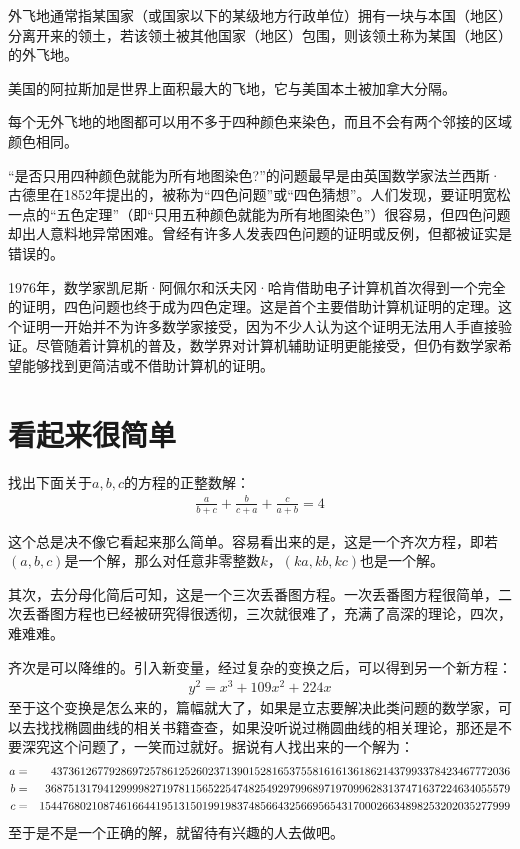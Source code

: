 \begin{definition}
  外飞地通常指某国家（或国家以下的某级地方行政单位）拥有一块与本国（地区）分离开来的领土，若该领土被其他国家（地区）包围，则该领土称为某国（地区）的外飞地。
\end{definition}

美国的阿拉斯加是世界上面积最大的飞地，它与美国本土被加拿大分隔。

\begin{example}
  每个无外飞地的地图都可以用不多于四种颜色来染色，而且不会有两个邻接的区域颜色相同。
\end{example}

“是否只用四种颜色就能为所有地图染色?”的问题最早是由英国数学家法兰西斯·古德里在1852年提出的，被称为“四色问题”或“四色猜想”。人们发现，要证明宽松一点的“五色定理”（即“只用五种颜色就能为所有地图染色”）很容易，但四色问题却出人意料地异常困难。曾经有许多人发表四色问题的证明或反例，但都被证实是错误的。

1976年，数学家凯尼斯·阿佩尔和沃夫冈·哈肯借助电子计算机首次得到一个完全的证明，四色问题也终于成为四色定理。这是首个主要借助计算机证明的定理。这个证明一开始并不为许多数学家接受，因为不少人认为这个证明无法用人手直接验证。尽管随着计算机的普及，数学界对计算机辅助证明更能接受，但仍有数学家希望能够找到更简洁或不借助计算机的证明。

\section{看起来很简单}
\label{sec:looks-simple}

\begin{example}
  找出下面关于$a,b,c$的方程的正整数解：
  \begin{align*}
    \frac{a}{b+c}+\frac{b}{c+a}+\frac{c}{a+b}=4
  \end{align*}
\end{example}
这个总是决不像它看起来那么简单。容易看出来的是，这是一个齐次方程，即若$(a,b,c)$是一个解，那么对任意非零整数$k$，$(ka, kb, kc)$也是一个解。

其次，去分母化简后可知，这是一个三次丢番图方程。一次丢番图方程很简单，二次丢番图方程也已经被研究得很透彻，三次就很难了，充满了高深的理论，四次，难难难。

齐次是可以降维的。引入新变量，经过复杂的变换之后，可以得到另一个新方程：
\begin{align*}
  y^2=x^3+109x^2+224x
\end{align*}
至于这个变换是怎么来的，篇幅就大了，如果是立志要解决此类问题的数学家，可以去找找椭圆曲线的相关书籍查查，如果没听说过椭圆曲线的相关理论，那还是不要深究这个问题了，一笑而过就好。据说有人找出来的一个解为：
\begin{align*}\small
a&=&4373612677928697257861252602371390152816537558161613618621437993378423467772036\\
b&=&36875131794129999827197811565225474825492979968971970996283137471637224634055579\\
c&=&154476802108746166441951315019919837485664325669565431700026634898253202035277999  
\end{align*}
至于是不是一个正确的解，就留待有兴趣的人去做吧。

